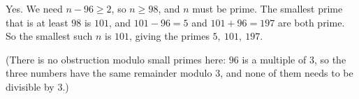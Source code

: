 Yes. We need $n-96\ge2$, so $n\ge98$, and $n$ must be prime. The smallest prime that is at least $98$ is $101$, and $101-96=5$ and $101+96=197$ are both prime. So the smallest such $n$ is $\boxed{101}$, giving the primes $5,\ 101,\ 197$.

(There is no obstruction modulo small primes here: $96$ is a multiple of $3$, so the three numbers have the same remainder modulo $3$, and none of them needs to be divisible by $3$.)
